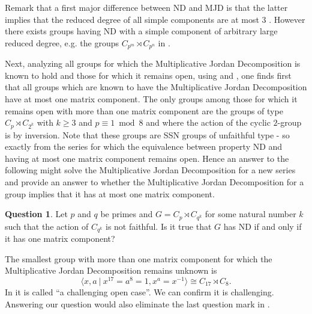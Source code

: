 \documentclass[a4paper,10pt]{amsart}
\theoremstyle{definition}
\newtheorem{question}[lemma]{Question}
\theoremstyle{remark}
\begin{document}
Remark that a first major difference between ND and MJD is that the latter implies that the reduced degree of all simple components are at most $3$ \cite{AroHalPAs}. However there exists groups having ND with a simple component  of arbitrary large reduced degree, e.g. the groups $C_{p^{m}} \rtimes C_{p^n}$ in \cite[Theorem A]{JespersSun}.

Next, analyzing all groups for which the Multiplicative Jordan Decomposition is known to hold and those for which it remains open, using  \cite[Section 7.4]{PolMilSehgalBook} and \cite{JespersSun}, one finds first that all groups which are known to have the Multiplicative Jordan Decomposition have at most one matrix component. The only groups among those for which it remains open with more than one matrix component are the groups of type $C_p \rtimes C_{2^k}$ with $k \geq 3$ and $p \equiv 1 \bmod 8$ and where the action of the cyclic $2$-group is by inversion. Note that these groups are SSN groups of unfaithful type - so exactly from the series for which the equivalence between property ND and having at most one matrix component remains open. Hence an answer to the following might solve the Multiplicative Jordan Decomposition for a new series and provide an answer to whether the Multiplicative Jordan Decomposition for a group implies that it has at most one matrix component.


\begin{question} \label{when MJD satisfy conjecture}
Let $p$ and $q$ be primes and $G= C_p \rtimes C_{q^k}$ for some natural number $k$ such that the action of $C_{q^k}$ is not faithful. Is it true that $G$ has ND if and only if it has one matrix component?
\end{question}

The smallest group with more than one matrix component for which the Multiplicative Jordan Decomposition remains unknown is
\[ \langle x, a \ | \ x^{17} = a^8 = 1, x^a = x^{-1} \rangle  \cong C_{17} \rtimes C_8.\]
In \cite[Section 4.1]{HalesPassi17} it is called ``a challenging open case''. We can confirm it is challenging. Answering our question would also eliminate the last question mark in \cite[Figure 1]{JespersSun}.




\end{document}

